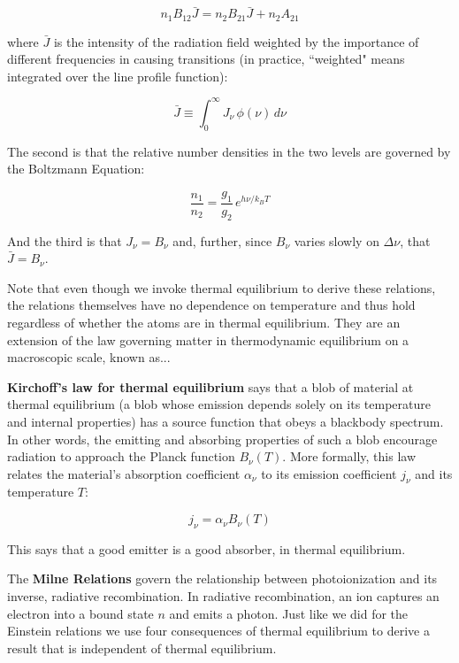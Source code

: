 \documentclass[12pt, letterpaper, preprint]{aastex}
\begin{document}
\begin{enumerate}
\begin{equation}
  n_1 B_{12} \bar{J} = n_2 B_{21} \bar{J} + n_2 A_{21}
  \label{detailed-balance}
\end{equation}

where $\bar{J}$ is the intensity of the radiation field
weighted by the importance of different frequencies
in causing transitions (in practice, ``weighted" means
integrated over the line profile function):

\begin{equation}
  \bar{J} \equiv \int_0^\infty J_\nu \, \phi(\nu) \, d\nu
  \label{jbar}
\end{equation}

The second is that the relative number densities in the two levels are governed by the Boltzmann Equation:

\begin{equation}
  \frac{n_1}{n_2} = \frac{g_1}{g_2} \, e^{h \nu / k_B T}
  \label{boltzmann-eq}
\end{equation}

And the third is that $J_\nu = B_\nu$ and, further, since
$B_\nu$ varies slowly on $\Delta \nu$, that $\bar{J} = B_\nu$. 

Note that even though we invoke thermal equilibrium to derive these relations, the relations themselves have no dependence on temperature and thus hold regardless of whether the atoms are in thermal equilibrium. They are an extension of the law governing matter in thermodynamic equilibrium on a macroscopic scale, known as...

\textbf{Kirchoff's law for thermal equilibrium}
says that a blob of material at thermal equilibrium
(a blob whose emission depends solely on its temperature
and internal properties)
has a source function that obeys a blackbody spectrum.
In other words, the emitting and absorbing properties
of such a blob encourage radiation to approach
the Planck function $B_\nu(T)$.
More formally, this law relates
the material's absorption coefficient $\alpha_\nu$
to its emission coefficient $j_\nu$
and its temperature $T$:

\begin{equation}
  j_\nu = \alpha_\nu B_\nu (T)
  \label{kirchoff-law}
\end{equation}

This says that a good emitter is a good absorber, in
thermal equilibrium.

The \textbf{Milne Relations} govern the relationship between
photoionization and its inverse, radiative recombination.
In radiative recombination, an ion captures an electron
into a bound state $n$ and emits a photon. 
Just like we did for the Einstein relations
we use four consequences of thermal equilibrium to
derive a result that is independent of thermal equilibrium. 


\end{enumerate}
\end{document}
